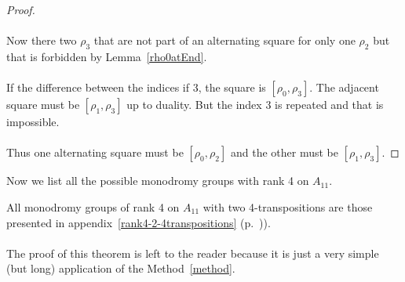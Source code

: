 \begin{proof}
\begin{figure}[H]
\begin{center}
      \caption{}
    \end{center}
  \end{figure}

  \paragraph{}
  Now there two $\rho_3$ that are not part of an alternating square for only one $\rho_2$ but that is forbidden by Lemma~\ref{rho0atEnd}.

  \paragraph{}
  If the difference between the indices if 3, the square is $[\rho_0, \rho_3]$. The adjacent square must be $[\rho_1, \rho_3]$ up to duality. But the index $3$ is repeated and that is impossible.

  \paragraph{}
  Thus one alternating square must be $[\rho_0, \rho_2]$ and the other must be $[\rho_1, \rho_3]$.

\end{proof}

Now we list all the possible monodromy groups with rank 4 on $A_{11}$.

\begin{theorem}
  All monodromy groups of rank 4 on $A_{11}$ with two 4-transpositions are those presented in appendix~\ref{rank4-2-4transpositions} (p.~\pageref{rank4-2-4transpositions})).
\end{theorem}

\paragraph{}
The proof of this theorem is left to the reader because it is just a very simple (but long) application of the Method~\ref{method}.


